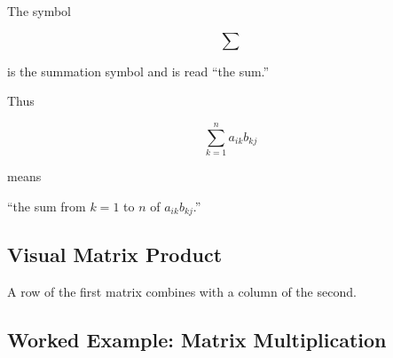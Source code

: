 The symbol

\[ \sum \]

is the summation symbol and is read ``the sum.''

Thus

\[ \sum_{k=1}^{n}a_{ik}b_{kj} \]

means

\begin{center}
``the sum from \(k=1\) to \(n\) of \(a_{ik}b_{kj}\).''
\end{center}

\subsection{Visual Matrix Product}
\label{subsec:visual-matrix-product}

\begin{center}
\end{center}

A row of the first matrix combines with a column of the second.

\subsection{Worked Example: Matrix Multiplication}
\label{subsec:worked-matrix-multiplication}


